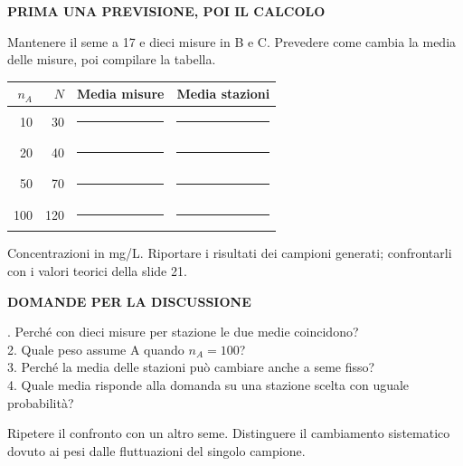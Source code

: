 \documentclass[12pt,aspectratio=1610]{beamer}
\newcommand{\PLabel}[1]{\par{\color{Classical}\bfseries\fontsize{9}{11}\selectfont\MakeUppercase{#1}}\par\vspace{1.8mm}}
\newcommand{\PBody}[1]{\par{\fontsize{11.3}{14.8}\selectfont #1\par}}
\newcommand{\PSmall}[1]{\par{\fontsize{9.8}{13.1}\selectfont #1\par}}
\newcommand{\PInfo}[1]{%
\begin{tcolorbox}[enhanced,arc=1.6mm,boxrule=.55pt,colback=GeoTint,
 colframe=Rule!80!Classical,left=2.3mm,right=2.3mm,top=2mm,bottom=2mm,
 before skip=1mm,after skip=1mm]
\PSmall{#1}\end{tcolorbox}}
\newcommand{\PilotChrome}[4]{%
  \node[anchor=north west,inner sep=0,text width=17.7cm] at ([xshift=.95cm,yshift=-.55cm]current page.north west) {\color{Navy}\bfseries\fontsize{20.6}{24.5}\selectfont #1};
  \node[anchor=north east,inner sep=0] at ([xshift=19.05cm,yshift=-.14cm]current page.north west) {\color{Classical}\fontsize{8}{10}\selectfont\hyperlink{slide2}{#2}};
  \draw[Classical,line width=1.2pt] ([xshift=.95cm,yshift=-1.7cm]current page.north west)--([xshift=2.35cm,yshift=-1.7cm]current page.north west);
  \draw[Rule,line width=.65pt] ([xshift=.95cm,yshift=-10.36cm]current page.north west)--([xshift=19.05cm,yshift=-10.36cm]current page.north west);
  \node[anchor=north west,inner sep=0] at ([xshift=.96cm,yshift=-10.55cm]current page.north west) {\color{Classical}\bfseries\fontsize{9.1}{12}\selectfont DA RICORDARE};
  \node[anchor=north west,inner sep=0,text width=14.3cm] at ([xshift=4.2cm,yshift=-10.53cm]current page.north west) {\color{Ink}\fontsize{10.3}{13.8}\selectfont #4};
  \draw[Rule,line width=.35pt] ([xshift=.95cm,yshift=-11.92cm]current page.north west)--([xshift=19.05cm,yshift=-11.92cm]current page.north west);
  \node[anchor=north west,inner sep=0] at ([xshift=.95cm,yshift=-12.06cm]current page.north west) {\color{Muted}\fontsize{7.7}{9.2}\selectfont Introduzione a R e all'analisi dei dati};
  \node[anchor=north east,inner sep=0] at ([xshift=19.05cm,yshift=-12.06cm]current page.north west) {\color{Muted}\fontsize{7.7}{9.2}\selectfont #3/84};
}
\begin{document}
\begin{frame}[plain]\hypertarget{slide26}{}
\end{frame}

\begin{lrbox}{\PilotLeftBox}%
\begin{minipage}[t]{10.05cm}\raggedright\color{Ink}\fontsize{11.3}{14.8}\selectfont

\PLabel{Prima una previsione, poi il calcolo}
\PBody{Mantenere il seme a 17 e dieci misure in B e C. Prevedere come cambia la media delle misure, poi compilare la tabella.}
\vspace{3mm}\renewcommand{\arraystretch}{1.5}
\begin{tabular}{@{}rrrr@{}}\toprule
$n_A$&$N$&Media misure&Media stazioni\\\midrule
10&30&\rule{1.8cm}{.3pt}&\rule{1.8cm}{.3pt}\\
20&40&\rule{1.8cm}{.3pt}&\rule{1.8cm}{.3pt}\\
50&70&\rule{1.8cm}{.3pt}&\rule{1.8cm}{.3pt}\\
100&120&\rule{1.8cm}{.3pt}&\rule{1.8cm}{.3pt}\\\bottomrule
\end{tabular}
\PSmall{Concentrazioni in mg/L. Riportare i risultati dei campioni generati; confrontarli con i valori teorici della slide 21.}

\end{minipage}%
\end{lrbox}
\begin{lrbox}{\PilotRightBox}%
\begin{minipage}[t]{7.55cm}\raggedright\color{Ink}\fontsize{11.3}{14.8}\selectfont

\PLabel{Domande per la discussione}
\PBody{1. Perché con dieci misure per stazione le due medie coincidono?\\[2mm]
2. Quale peso assume A quando \(n_A=100\)?\\[2mm]
3. Perché la media delle stazioni può cambiare anche a seme fisso?\\[2mm]
4. Quale media risponde alla domanda su una stazione scelta con uguale probabilità?}
\vspace{3mm}\PInfo{Ripetere il confronto con un altro seme. Distinguere il cambiamento sistematico dovuto ai pesi dalle fluttuazioni del singolo campione.}

\end{minipage}%
\end{lrbox}
\end{document}
